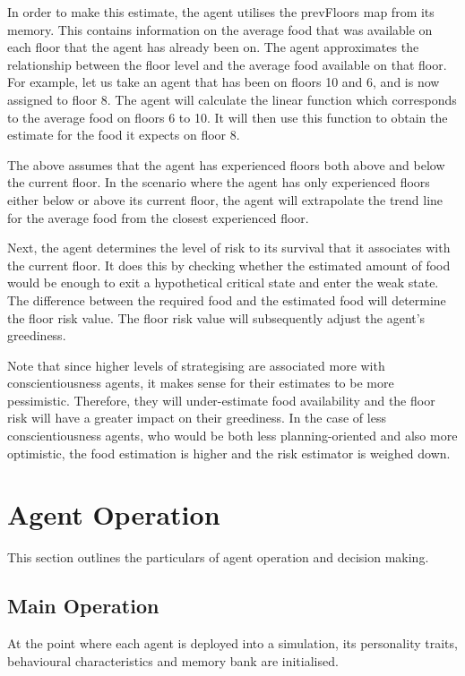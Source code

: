 In order to make this estimate, the agent utilises the prevFloors map from its memory. This contains information on the average food that was available on each floor that the agent has already been on. The agent approximates the relationship between the floor level and the average food available on that floor. For example, let us take an agent that has been on floors 10 and 6, and is now assigned to floor 8. The agent will calculate the linear function which corresponds to the average food on floors 6 to 10. It will then use this function to obtain the estimate for the food it expects on floor 8. 

The above assumes that the agent has experienced floors both above and below the current floor. In the scenario where the agent has only experienced floors either below or above its current floor, the agent will extrapolate the trend line for the average food from the closest experienced floor. 

Next, the agent determines the level of risk to its survival that it associates with the current floor. It does this by checking whether the estimated amount of food would be enough to exit a hypothetical critical state and enter the weak state. The difference between the required food and the estimated food will determine the floor risk value. The floor risk value will subsequently adjust the agent's greediness. 

Note that since higher levels of strategising are associated more with conscientiousness agents, it makes sense for their estimates to be more pessimistic. Therefore, they will under-estimate food availability and the floor risk will have a greater impact on their greediness. In the case of less conscientiousness agents, who would be both less planning-oriented and also more optimistic, the food estimation is higher and the risk estimator is weighed down.

\section{Agent Operation}
\label{sec: Agent Operation}
This section outlines the particulars of agent operation and decision making.

\subsection{Main Operation}
\label{subsec: Main Operation}
At the point where each agent is deployed into a simulation, its personality traits, behavioural characteristics and memory bank are initialised. 

